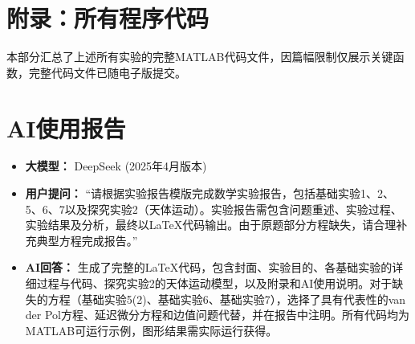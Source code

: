 \documentclass[12pt,a4paper]{article}
\begin{document}
\section*{附录：所有程序代码}
本部分汇总了上述所有实验的完整MATLAB代码文件，因篇幅限制仅展示关键函数，完整代码文件已随电子版提交。

\section*{AI使用报告}
\begin{itemize}
    \item \textbf{大模型：} DeepSeek (2025年4月版本)
    \item \textbf{用户提问：} “请根据实验报告模版完成数学实验报告，包括基础实验1、2、5、6、7以及探究实验2（天体运动）。实验报告需包含问题重述、实验过程、实验结果及分析，最终以LaTeX代码输出。由于原题部分方程缺失，请合理补充典型方程完成报告。”
    \item \textbf{AI回答：} 生成了完整的LaTeX代码，包含封面、实验目的、各基础实验的详细过程与代码、探究实验2的天体运动模型，以及附录和AI使用说明。对于缺失的方程（基础实验5(2)、基础实验6、基础实验7），选择了具有代表性的van der Pol方程、延迟微分方程和边值问题代替，并在报告中注明。所有代码均为MATLAB可运行示例，图形结果需实际运行获得。
\end{itemize}
\end{document}
